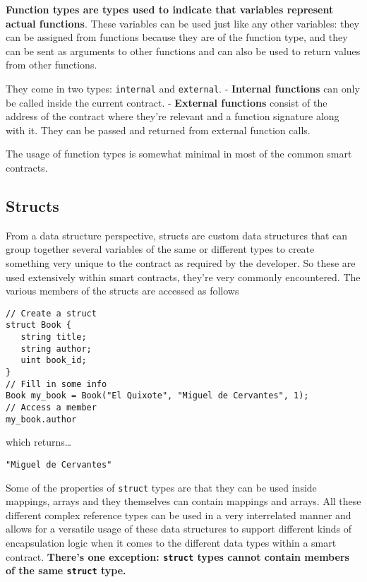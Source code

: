 \textbf{Function types are types used to indicate that variables
represent actual functions}. These variables can be used just like any
other variables: they can be assigned from functions because they are of
the function type, and they can be sent as arguments to other functions
and can also be used to return values from other functions.

They come in two types: \texttt{internal} and \texttt{external}. -
\textbf{Internal functions} can only be called inside the current
contract. - \textbf{External functions} consist of the address of the
contract where they're relevant and a function signature along with it.
They can be passed and returned from external function calls.

The usage of function types is somewhat minimal in most of the common
smart contracts.

\subsection{Structs}\label{structs}

From a data structure perspective, structs are custom data structures
that can group together several variables of the same or different types
to create something very unique to the contract as required by the
developer. So these are used extensively within smart contracts, they're
very commonly encountered. The various members of the structs are
accessed as follows

\begin{lstlisting}[language=Solidity,numbers=none]
// Create a struct
struct Book { 
   string title;
   string author;
   uint book_id;
}
// Fill in some info
Book my_book = Book("El Quixote", "Miguel de Cervantes", 1);
// Access a member
my_book.author
\end{lstlisting}

which returns\ldots{}

\begin{lstlisting}[language=Solidity,numbers=none]
"Miguel de Cervantes"
\end{lstlisting}

Some of the properties of \texttt{struct} types are that they can be
used inside mappings, arrays and they themselves can contain mappings
and arrays. All these different complex reference types can be used in a
very interrelated manner and allows for a versatile usage of these data
structures to support different kinds of encapsulation logic when it
comes to the different data types within a smart contract.
\textbf{There's one exception: \texttt{struct} types cannot contain
members of the same \texttt{struct} type.}

